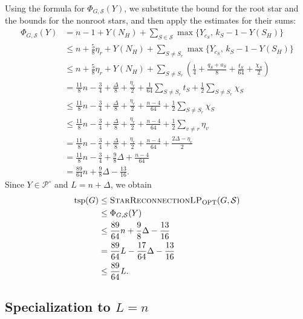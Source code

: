 \documentclass[11pt]{amsart}
\newcommand{\1}{\mathbbm{1}}
\newcommand{\LPtwo}{\textsc{StarReconnectionLP}}
\begin{document}
Using the formula for $\Phi_{G,\mathcal S}(Y)$,
we substitute the bound for the root star and the bounds for
the nonroot stars, and then apply the estimates for their sums:
\[
\begin{aligned}
\Phi_{G,\mathcal S}(Y)
&=n-1+Y(N_H)
  +\sum_{S\in\mathcal S}
     \max\{Y_{c_S},\,k_S-1-Y(S_H)\}\\[5pt]
&\le n+\frac58\eta_r+Y(N_H)
  +\sum_{S\ne S_r}
     \max\{Y_{c_S},\,k_S-1-Y(S_H)\}\\[5pt]
&\le n+\frac58\eta_r+Y(N_H)
  +\sum_{S\ne S_r}
     \left(\frac14+\frac{q_S+a_S}{8}
           +\frac{t_S}{64}+\frac{\chi_S}{2}\right)\\[5pt]
&=\frac{11}{8}n-\frac34+\frac{\Delta}{8}
  +\frac{\eta_r}{2}
  +\frac1{64}\sum_{S\ne S_r}t_S
  +\frac12\sum_{S\ne S_r}\chi_S\\[5pt]
&\le\frac{11}{8}n-\frac34+\frac{\Delta}{8}
  +\frac{\eta_r}{2}+\frac{n-4}{64}
  +\frac12\sum_{S\ne S_r}\chi_S\\[5pt]
&\le\frac{11}{8}n-\frac34+\frac{\Delta}{8}
  +\frac{\eta_r}{2}+\frac{n-4}{64}
  +\frac12\sum_{v\ne r}\eta_v\\[5pt]
&=\frac{11}{8}n-\frac34+\frac{\Delta}{8}
  +\frac{\eta_r}{2}+\frac{n-4}{64}
  +\frac{2\Delta-\eta_r}{2}\\[5pt]
&=\frac{11}{8}n-\frac34+\frac98\Delta+\frac{n-4}{64}\\[5pt]
&=\frac{89}{64}n+\frac98\Delta-\frac{13}{16}.
\end{aligned}
\]
Since $Y\in{\mathcal P^\circ}$
and $L=n+\Delta$, we obtain
\[
\begin{aligned}
\operatorname{tsp}(G)
&\le\text{\LPtwo}_{\mathrm{OPT}}(G,\mathcal S)\\
&\le\Phi_{G,\mathcal S}(Y)\\
&\le\frac{89}{64}n+\frac98\Delta-\frac{13}{16}\\
&=\frac{89}{64}L-\frac{17}{64}\Delta-\frac{13}{16}\\
&\le\frac{89}{64}L.
\end{aligned}
\]


















\subsection{\texorpdfstring{{Specialization to $L=n$}}{Specialization to L=n}}
\label{subsec:value-n-specialization}
\end{document}
